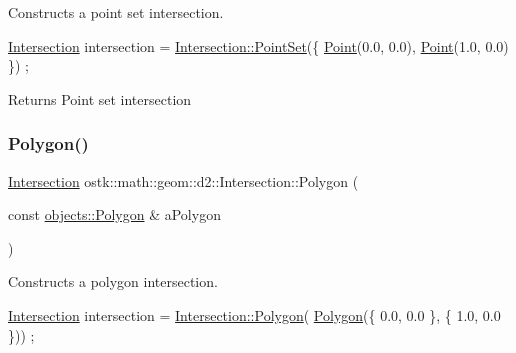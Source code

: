 Constructs a point set intersection. 


\begin{DoxyCode}
\hyperlink{classostk_1_1math_1_1geom_1_1d2_1_1_intersection_a52e7ba577832b73a1eb5c95eaddf2834}{Intersection} intersection = \hyperlink{classostk_1_1math_1_1geom_1_1d2_1_1_intersection_a7ae709aa5346528c7024d9b650247fc0}{Intersection::PointSet}(\{ 
      \hyperlink{classostk_1_1math_1_1geom_1_1d2_1_1_intersection_a26cc1aec3f2576ec97f0cd54aea9d935}{Point}(0.0, 0.0), \hyperlink{classostk_1_1math_1_1geom_1_1d2_1_1_intersection_a26cc1aec3f2576ec97f0cd54aea9d935}{Point}(1.0, 0.0) \}) ;
\end{DoxyCode}


\begin{DoxyReturn}{Returns}
Point set intersection 
\end{DoxyReturn}
\mbox{\label{classostk_1_1math_1_1geom_1_1d2_1_1_intersection_ae0e221d32a983ada797341ee135dbd5b}} 
\subsubsection{\texorpdfstring{Polygon()}{Polygon()}}
{\footnotesize\ttfamily \hyperlink{classostk_1_1math_1_1geom_1_1d2_1_1_intersection}{Intersection} ostk\+::math\+::geom\+::d2\+::\+Intersection\+::\+Polygon (\begin{DoxyParamCaption}\item[{const \hyperlink{classostk_1_1math_1_1geom_1_1d2_1_1objects_1_1_polygon}{objects\+::\+Polygon} \&}]{a\+Polygon }\end{DoxyParamCaption})\hspace{0.3cm}{\ttfamily [static]}}



Constructs a polygon intersection. 


\begin{DoxyCode}
\hyperlink{classostk_1_1math_1_1geom_1_1d2_1_1_intersection_a52e7ba577832b73a1eb5c95eaddf2834}{Intersection} intersection = \hyperlink{classostk_1_1math_1_1geom_1_1d2_1_1_intersection_ae0e221d32a983ada797341ee135dbd5b}{Intersection::Polygon}(
      \hyperlink{classostk_1_1math_1_1geom_1_1d2_1_1_intersection_ae0e221d32a983ada797341ee135dbd5b}{Polygon}(\{ 0.0, 0.0 \}, \{ 1.0, 0.0 \})) ;
\end{DoxyCode}


